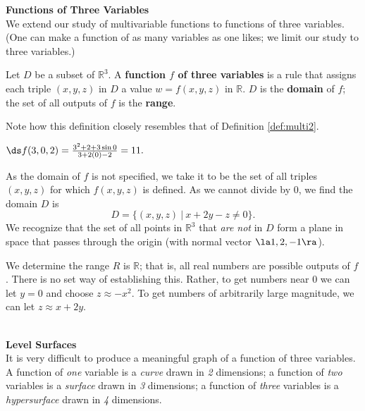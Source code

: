 \noindent\textbf{\large Functions of Three Variables}\\

We extend our study of multivariable functions to functions of three variables. (One can make a function of as many variables as one likes; we limit our study to three variables.)

{Let $D$ be a subset of $\mathbb{R}^3$. A \textbf{function $f$ of three variables} is a rule that assigns each triple $(x,y,z)$ in $D$ a value $w=f(x,y,z)$ in $\mathbb{R}$. $D$ is the \textbf{domain} of $f$; the set of all outputs of $f$ is the \textbf{range}.
}

Note how this definition closely resembles that of Definition \ref{def:multi2}.\\

{$\ds f(3,0,2) = \frac{3^2+2+3\sin 0}{3+2(0)-2} = 11.$

As the domain of $f$ is not specified, we take it to be the set of all triples $(x,y,z)$ for which $f(x,y,z)$ is defined. As we cannot divide by $0$, we find the domain $D$ is 
$$D = \{(x,y,z)\ |\ x+2y-z\neq 0\}.$$
We recognize that the set of all points in $\mathbb{R}^3$ that \textit{are not} in $D$ form a plane in space that passes through the origin (with normal vector $\la 1,2,-1\ra$). 

We determine the range $R$ is $\mathbb{R}$; that is, all real numbers are possible outputs of $f$. There is no set way of establishing this. Rather, to get numbers near 0 we can let $y=0$ and choose $z \approx -x^2$. To get numbers of arbitrarily large magnitude, we can let $z\approx x+2y$. 
}\\

\clearpage
\noindent\textbf{\large Level Surfaces}\\

It is very difficult to produce a meaningful graph of a function of three variables. A function of \textit{one} variable is a \textit{curve} drawn in \textit{2} dimensions; a function of \textit{two} variables is a \textit{surface} drawn in \textit{3} dimensions; a function of \textit{three} variables is a \textit{hypersurface} drawn in \textit{4} dimensions.

